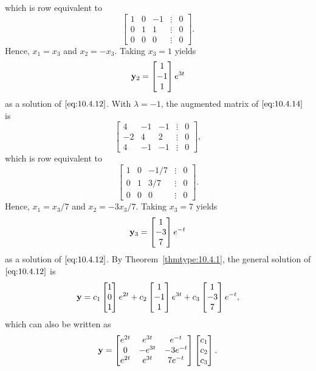 \documentclass{ximera}
\begin{document}
\begin{example}
\begin{explanation}
$$$$
which is row equivalent to
$$
\begin{bmatrix} 1&0&-1&\vdots&0\\0&1&1&
\vdots&0\\0&0&0&\vdots&0\end{bmatrix}.
$$
Hence,  $x_1=x_3$ and $x_2=-x_3$. Taking $x_3=1$ yields
$$
{\bf y}_2=\begin{bmatrix}1\\-1\\1\end{bmatrix}e^{3t}
$$
as a solution of  $\eqref{eq:10.4.12}$.  With $\lambda=-1$, the augmented
matrix of  $\eqref{eq:10.4.14}$ is
$$
\begin{bmatrix} 4&-1&-1&\vdots&0\\-2&4&
2&\vdots&0\\4&-1&-1&\vdots&0
\end{bmatrix},
$$
which is row equivalent to
$$
\begin{bmatrix} 1&0&-1/7&\vdots&0\\0&1&
3/7&\vdots&0\\0&0&0&\vdots&0\end{bmatrix}.
$$
Hence, $x_1=x_3/7$ and $x_2=-3x_3/7$.  Taking $x_3=7$ yields
$$
{\bf y}_3=\begin{bmatrix}1\\-3\\7\end{bmatrix}e^{-t}
$$
as a solution of  $\eqref{eq:10.4.12}$. By Theorem~\ref{thmtype:10.4.1},
 the general solution of  $\eqref{eq:10.4.12}$ is
$$
{\bf y}=c_1\begin{bmatrix}1\\0\\1\end{bmatrix}e^{2t}
+c_2\begin{bmatrix}1\\-1\\1\end{bmatrix}
e^{3t}+c_3
\begin{bmatrix}1\\-3\\7\end{bmatrix}e^{-t},
$$
which can also be written as
\begin{equation}\label{eq:10.4.15}
{\bf y}=\begin{bmatrix}e^{2t}&e^{3t}&e^{-t}
\\0&-e^{3t}&
-3e^{-t}\\e^{2t}&e^{3t}&7e^{-t}\end{bmatrix}\begin{bmatrix} c_1\\c_2\\c_3\end{bmatrix}.
\end{equation}


\end{explanation}
\end{example}
\end{document}
